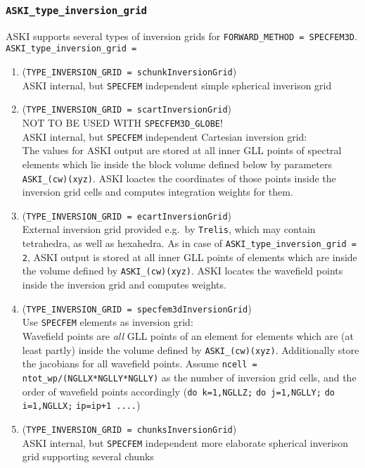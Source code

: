 \documentclass[12pt,a4paper]{article}
\newcommand{\lcode}[1]{\nolinkurl{#1}}
\newcommand{\ASKI}{ {\ttfamily ASKI} }
\begin{document}
\subsubsection*{\lcode{ASKI_type_inversion_grid}}
ASKI supports several types of inversion grids for \lcode{FORWARD_METHOD = SPECFEM3D}.
\lcode{ASKI_type_inversion_grid = }
\begin{enumerate}
\item (\lcode{TYPE_INVERSION_GRID = schunkInversionGrid}) \\ 
  \ASKI{} internal, but \lcode{SPECFEM} independent simple spherical inverison grid
\item (\lcode{TYPE_INVERSION_GRID = scartInversionGrid})\\
  NOT TO BE USED WITH \lcode{SPECFEM3D_GLOBE}!\\
  \ASKI{} internal, but \lcode{SPECFEM} independent Cartesian inversion grid:\\
  The values for \ASKI{} output are stored at all inner GLL points of spectral elements which lie
  inside the block volume defined below by parameters \lcode{ASKI_(cw)(xyz)}.
  \ASKI{} loactes the coordinates of those points inside the inversion grid cells and computes
  integration weights for them.
\item (\lcode{TYPE_INVERSION_GRID = ecartInversionGrid}) \\
  External inversion grid provided e.g.\ by \lcode{Trelis}, which may contain tetrahedra, as well as hexahedra.
  As in case of \lcode{ASKI_type_inversion_grid = 2}, \ASKI{} output is stored at all inner GLL points of elements
  which are inside the volume defined by \lcode{ASKI_(cw)(xyz)}.
  \ASKI{} locates the wavefield points inside the inversion grid and computes weights.
\item (\lcode{TYPE_INVERSION_GRID = specfem3dInversionGrid}) \\
  Use \lcode{SPECFEM} elements as inversion grid:\\
  Wavefield points are \emph{all} GLL points of an element for elements which are (at least partly) inside the 
  volume defined by \lcode{ASKI_(cw)(xyz)}. Additionally store the jacobians for all wavefield points.
  Assume \lcode{ncell = ntot_wp/(NGLLX*NGLLY*NGLLY)} as the number of inversion grid cells, and the order of 
  wavefield points accordingly (\lcode{do k=1,NGLLZ;} \lcode{do j=1,NGLLY;} \lcode{do i=1,NGLLX;} \lcode{ip=ip+1 ....})
\item (\lcode{TYPE_INVERSION_GRID = chunksInversionGrid}) \\ 
  \ASKI{} internal, but \lcode{SPECFEM} independent more elaborate spherical inverison grid supporting several chunks
\end{enumerate}
\end{document}
